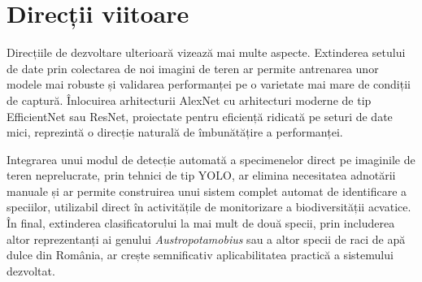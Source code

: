 \section*{Direcții viitoare}

Direcțiile de dezvoltare ulterioară vizează mai multe aspecte. Extinderea setului de date prin colectarea de noi imagini de teren ar permite antrenarea unor modele mai robuste și validarea performanței pe o varietate mai mare de condiții de captură. Înlocuirea arhitecturii AlexNet cu arhitecturi moderne de tip EfficientNet sau ResNet, proiectate pentru eficiență ridicată pe seturi de date mici, reprezintă o direcție naturală de îmbunătățire a performanței.

Integrarea unui modul de detecție automată a specimenelor direct pe imaginile de teren neprelucrate, prin tehnici de tip YOLO, ar elimina necesitatea adnotării manuale și ar permite construirea unui sistem complet automat de identificare a speciilor, utilizabil direct în activitățile de monitorizare a biodiversității acvatice. În final, extinderea clasificatorului la mai mult de două specii, prin includerea altor reprezentanți ai genului \textit{Austropotamobius} sau a altor specii de raci de apă dulce din România, ar crește semnificativ aplicabilitatea practică a sistemului dezvoltat.


